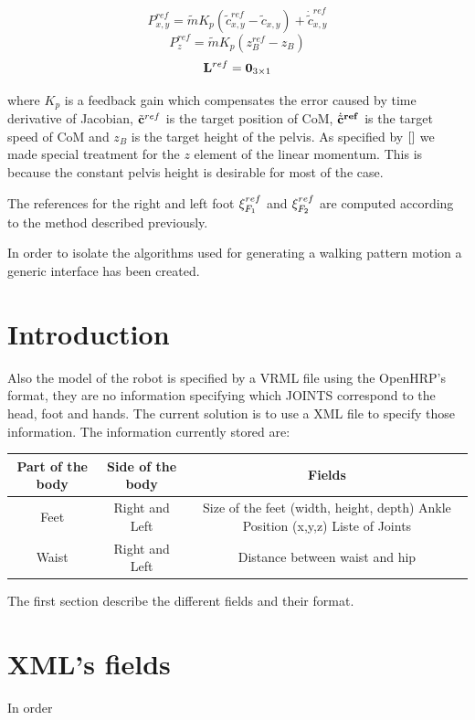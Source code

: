 \begin{equation}
P^{ref}_{x,y} = \tilde{m}K_p (\tilde{c}_{x,y}^{ref} - \tilde{c}_{x,y} )+ \dot{\tilde{c}}^{ref}_{x,y}
\label{eq:XYLinearMomentum}
\end{equation}
\begin{equation}
P^{ref}_{z} = \tilde{m} K_p (z_B^{ref} - z_B)
\label{eq:ZLinearMomentum}
\end{equation}
\begin{equation}
{\bf L}^{ref} = {\bf 0}_{3 \times 1}
\end{equation}

where $K_p$ is a feedback gain which compensates the error caused by time derivative of Jacobian,
$\tilde{\bf c}^{ref}$ is the target position of CoM, $\dot{\tilde{\bf c}}^{ref}$ is the target
speed of CoM and $z_B$ is the target height of the pelvis. As specified by $\cite{}$
we made special treatment for the $z$ element of the linear momentum. This is because the constant
pelvis height is desirable for most of the case.
\par
The references for the right and left foot ${\bf \xi}^{ref}_{F_1}$ and ${\bf \xi}^{ref}_{F_2}$
are computed according to the method described previously.


In order to isolate the algorithms used for generating a walking pattern motion
a generic interface has been created. 


\section{Introduction}
Also the model of the robot is specified by a VRML file using the OpenHRP's format,
they are no information specifying which JOINTS correspond to the head, foot and hands.
The current solution is to use a XML file to specify those information.
The information currently stored are:
\begin{table}
\begin{tabular}{|c|c|c|} \hline
Part of the body & Side of the body & Fields \\ \hline \hline
Feet & Right and Left & 
Size of the feet (width, height, depth) \linebreak 
Ankle Position (x,y,z) \linebreak
Liste of Joints  \\ \hline
Waist & Right and Left & Distance between waist and hip \\ \hline
\end{tabular}
\end{table}
The first section describe the different fields and their format.

\section{XML's fields}
In order 